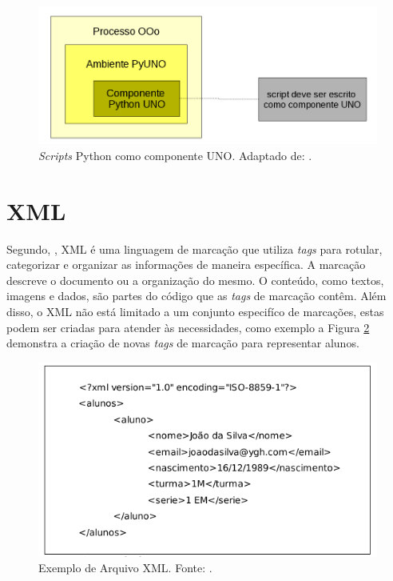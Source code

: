 \begin{figure}[ht]
  \centering
  \includegraphics[scale=0.41,bb=0 0 574 257]{mode_component2.png}
  \caption{\textit{Scripts} Python como componente UNO. Adaptado de: \cite{web:uno}.}
\label{mode_component.png}
\end{figure}

\section{XML}

Segundo, \cite{xml_dummies}, XML é uma linguagem de marcação que utiliza \textit{tags} para rotular, categorizar e organizar as informações de maneira específica. A marcação descreve o documento ou a organização do mesmo. O conteúdo, como textos, imagens e dados, são partes do código que as \textit{tags} de marcação contêm. Além disso, o XML não está limitado a um conjunto especifíco de marcações, estas podem ser criadas para atender às necessidades, como exemplo a Figura \ref{xml.png} demonstra a criação de novas \textit{tags} de marcação para representar alunos.

\begin{figure}[ht]
\centering
\begin{center}
   \includegraphics[scale=0.55,bb=0 0 450 236]{xml.png}
\end{center}
\caption{Exemplo de Arquivo XML. Fonte: \cite{ronaldo}.}
\label{xml.png}
\end{figure}

